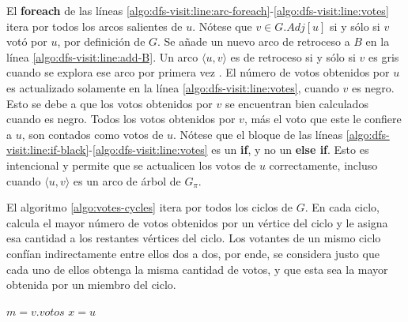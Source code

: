 El \textbf{foreach} de las l\'ineas \ref{algo:dfs-visit:line:arc-foreach}-\ref{algo:dfs-visit:line:votes} itera por todos los arcos salientes de $u$. N\'otese que $v \in G.Adj[u]$ si y s\'olo si $v$ vot\'o por $u$, por definici\'on de $G$.  Se a\~nade un nuevo arco de retroceso a $B$ en la l\'inea \ref{algo:dfs-visit:line:add-B}. Un arco $\langle u, v \rangle$ es de retroceso si y s\'olo si $v$ es gris cuando se explora ese arco por primera vez \citep{intro-to-algo-3}. El n\'umero de votos obtenidos por $u$ es actualizado solamente en la l\'inea \ref{algo:dfs-visit:line:votes}, cuando $v$ es negro. Esto se debe a que los votos obtenidos por $v$ se encuentran bien calculados cuando es negro. Todos los votos obtenidos por $v$, m\'as el voto que este le confiere a $u$, son contados como votos de  $u$. N\'otese que el bloque de las l\'ineas \ref{algo:dfs-visit:line:if-black}-\ref{algo:dfs-visit:line:votes} es un \textbf{if}, y no un \textbf{else if}. Esto es intencional y permite que se actualicen los votos de $u$ correctamente, incluso cuando $\langle u, v \rangle$ es un arco de \'arbol de $G_\pi$.


El algoritmo \ref{algo:votes-cycles} itera por todos los ciclos de $G$. En cada ciclo, calcula el mayor n\'umero de votos obtenidos por un v\'ertice del ciclo y le asigna esa cantidad a los restantes v\'ertices del ciclo. Los votantes de un mismo ciclo conf\'ian indirectamente entre ellos dos a dos, por ende, se considera justo que cada uno de ellos obtenga la misma cantidad de votos, y que esta sea la mayor obtenida por un miembro del ciclo.

\begin{algorithm}[!h]
    \caption{\cyclevotescaption}
    \label{algo:votes-cycles}
    \DontPrintSemicolon
    \SetAlgoLined
    \BlankLine

\end{algorithm}


\begin{algorithm}[!h]
    \caption{\maxincyclecaption}
    \label{algo:max-in-cycle}
    \DontPrintSemicolon
    \SetAlgoLined
    \BlankLine

    $m = v.votos$\;
    $x = u$\;
    \;
\end{algorithm}

